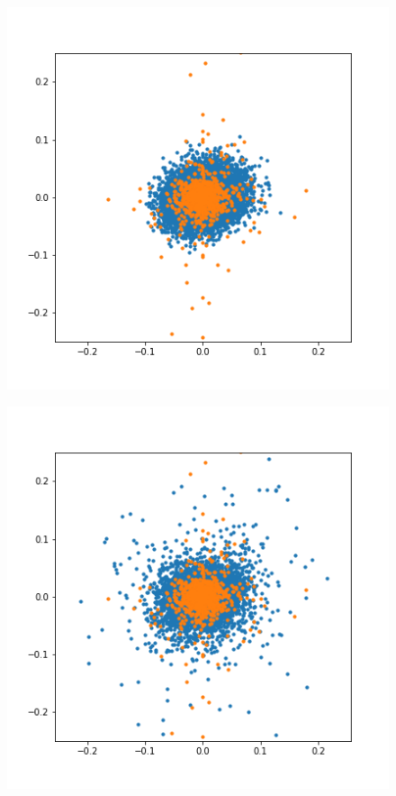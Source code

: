 \documentclass{article}
\begin{document}
\begin{figure}[!ht]
    \begin{center}
        \begin{minipage}{.33\linewidth}
            \centering
            \includegraphics[width=\textwidth]{pics/gen_gbm.png}
            \label{fig:gen_gbm}
        \end{minipage}%
        \begin{minipage}{.33\linewidth}
            \centering
            \includegraphics[width=\textwidth]{pics/gen_t_copula.png}

\end{minipage}
\end{center}
\end{figure}
\end{document}
